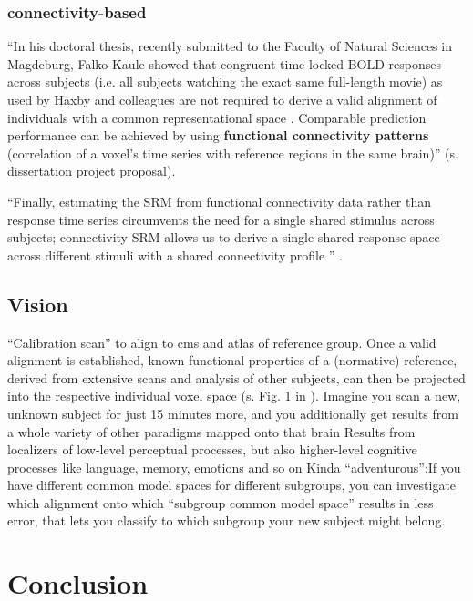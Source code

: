 \subsubsection{connectivity-based}



``In his doctoral thesis, recently submitted to the Faculty of Natural Sciences
in Magdeburg, Falko Kaule showed that congruent time-locked BOLD responses
across subjects (i.e. all subjects watching the exact same full-length movie) as
used by Haxby and colleagues are not required to derive a valid alignment of
individuals with a common representational space \citep{kaule2017examination}.
%
Comparable prediction performance can be achieved by using \textbf{functional
connectivity patterns} (correlation of a voxel's time series with reference
regions in the same brain)'' (s. dissertation project proposal).


``Finally, estimating the SRM from functional connectivity
data rather than response time series circumvents the need for a single shared
stimulus across subjects; connectivity SRM allows us to derive a single shared
response space across different stimuli with a shared connectivity profile
\citep{nastase2019leveraging}'' \citep{kumar2020brainiak}.




\subsection{Vision}

``Calibration scan'' to align to \ac{cms} and atlas of reference group.
%
Once a valid alignment is established, known functional properties of a
(normative) reference, derived from extensive scans and analysis of other
subjects, can then be projected into the respective individual voxel space (s.
Fig. 1 in \citep{nishimoto2016lining}).
%
Imagine you scan a new, unknown subject for just 15 minutes more, and you
additionally get results from a whole variety of other paradigms mapped onto
that brain
%
Results from localizers of low-level perceptual processes, but also higher-level
cognitive processes like language, memory, emotions and so on
%
Kinda ``adventurous'':If you have different common model spaces for different
subgroups, you can investigate which alignment onto which ``subgroup common
model space'' results in less error, that lets you classify to which subgroup
your new subject might belong.


\section{Conclusion}
